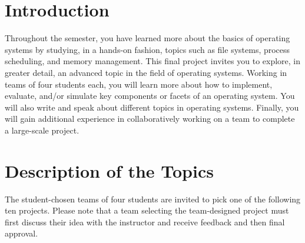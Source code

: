 

\usepackage[compact]{titlesec}


\section*{Introduction}

Throughout the semester, you have learned more about the basics of operating systems by studying, in a hands-on fashion,
topics such as file systems, process scheduling, and memory management.  This final project invites you to explore, in
greater detail, an advanced topic in the field of operating systems. Working in teams of four students each, you will
learn more about how to implement, evaluate, and/or simulate key components or facets of an operating system. You will
also write and speak about different topics in operating systems.  Finally, you will gain additional experience in
collaboratively working on a team to complete a large-scale project.

\section*{Description of the Topics}

The student-chosen teams of four students are invited to pick one of the following ten projects.  Please note that a
team selecting the team-designed project must first discuss their idea with the instructor and receive feedback and
then final approval.


